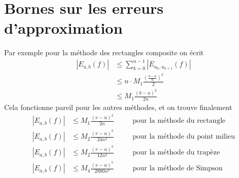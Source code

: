 \section{Bornes sur les erreurs d'approximation}

\ques Par exemple pour la méthode des rectangles composite on écrit 
\begin{align*}
    |E_{a, b}(f)| &\leq \sum_{k=0}^{n-1} |E_{u_k, u_{k+1}}(f)|\\
                  &\leq n \cdot M_1 \frac{(\frac{b-a}{n})^2}{2}\\
                  &\leq M_1 \frac{(b-a)^2}{2n}
\end{align*}
Cela fonctionne pareil pour les autres méthodes, et on trouve finalement
\begin{align*}
    |E_{a,b}(f)| &\leq M_1 \frac{(v-u)^2}{2n} \quad &&\textrm{pour la méthode du rectangle}\\
    |E_{a,b}(f)| &\leq M_2 \frac{(v-u)^3}{24n^2} \quad &&\textrm{pour la méthode du point milieu}\\
    |E_{a,b}(f)| &\leq M_2 \frac{(v-u)^3}{12n^2} \quad &&\textrm{pour la méthode du trapèze}\\
    |E_{a,b}(f)| &\leq M_4 \frac{(v-u)^5}{2880n^4} \quad &&\textrm{pour la méthode de Simpson}\\
\end{align*}
